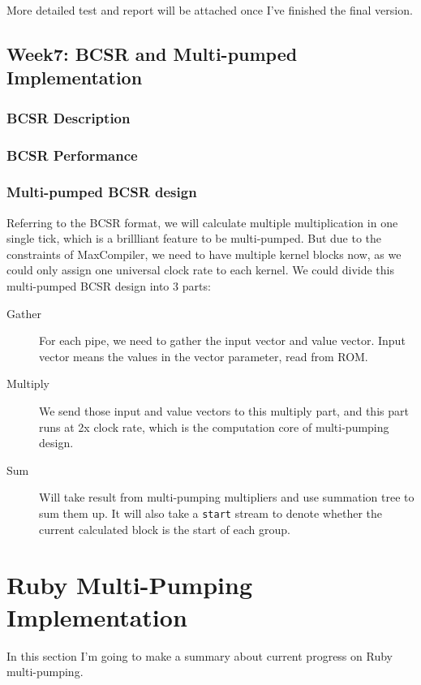 \documentclass[a4paper, 10pt]{article}
\begin{document}
More detailed test and report will be attached once I've finished the final version.

\subsection{Week7: BCSR and Multi-pumped Implementation}

\subsubsection{BCSR Description}

\subsubsection{BCSR Performance}

\subsubsection{Multi-pumped BCSR design}

Referring to the BCSR format, we will calculate multiple multiplication in one single tick, which is a brillliant feature to be multi-pumped. But due to the constraints of MaxCompiler, we need to have multiple kernel blocks now, as we could only assign one universal clock rate to each kernel. We could divide this multi-pumped BCSR design into 3 parts:

\begin{description}
\item[Gather] For each pipe, we need to gather the input vector and value vector. Input vector means the values in the vector parameter, read from ROM. 
\item[Multiply] We send those input and value vectors to this multiply part, and this part runs at 2x clock rate, which is the computation core of multi-pumping design.
\item[Sum] Will take result from multi-pumping multipliers and use summation tree to sum them up. It will also take a \texttt{start} stream to denote whether the current calculated block is the start of each group.
\end{description}

\section{Ruby Multi-Pumping Implementation}

In this section I'm going to make a summary about current progress on Ruby multi-pumping. 
\end{document}
